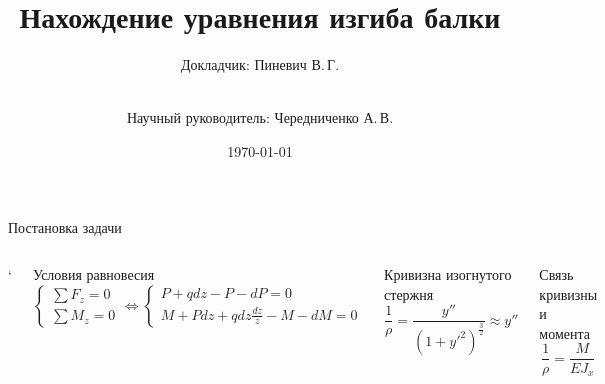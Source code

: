 \documentclass[ignoreonframetext,unicode]{beamer}
\title[Уравнение изгиба балки]{Нахождение уравнения изгиба балки}
\author[Пиневич В.\,Г.]{Докладчик: Пиневич В.\,Г.\and\\[0.5mm] Научный руководитель: Чередниченко А.\,В.}
\institute[каф. Прикладная математика ФН-2]{группа ФН2-41Б}
\date{\today}
\begin{document}
	
	\begin{frame}[plain]
		\maketitle
	\end{frame}

	\begin{frame}{Постановка задачи}
		\begin{columns}
			\column{\textwidth}`
			\begin{block}{Условия равновесия}\vspace*{-3.5mm}
			 \[
			 	\begin{cases}
			 	\sum\limits {{F_z = 0}} \\
			 	\sum\limits {{M_z = 0}}
			 \end{cases}
			 \Leftrightarrow
			 \begin{cases}
			 	P + q dz - P - dP = 0 \\
			 	M + P dz + q dz \frac {dz}{z} - M -dM = 0
			 \end{cases}
			 \]
			\end{block}
		\begin{columns}
			\begin{block}{Кривизна изогнутого стержня}	
				\[
				\frac{1}{\rho} = \frac{y''}{(1 + y'^2)^{\frac{3}{2}}} \approx y''
				\]
			\end{block}
			\vspace*{-1.0mm}
			\begin{block}{Связь кривизны и момента}	
				\[
				\frac{1}{\rho} = \frac{M}{E J_{x}}
				\]
			\end{block}
		\end{columns}

		\begin{columns}
			\column{0.5\textwidth}
			\includegraphics[width=\textwidth]{pic.1.1}
			\column{0.5\textwidth}
			\includegraphics[width=\textwidth]{pic.1.2}
		\end{columns}


\end{columns}
\end{frame}
\end{document}
